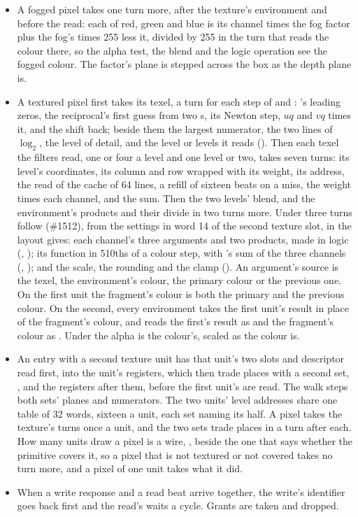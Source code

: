 \begin{itemize}
of the blend in the turn the blend's divide takes, before the mask, so
a pixel takes no cycle more.
\item A fogged pixel takes one turn more, after the texture's
environment and before the read: each of red, green and blue is its
channel times the fog factor plus the fog's times 255 less it, divided
by 255 in the turn that reads the colour there, so the alpha test, the
blend and the logic operation see the fogged colour. The factor's
plane is stepped across the box as the depth plane is.
\item A textured pixel first takes its texel, a turn for each step of
 and : 's leading zeros,
the reciprocal's first guess from two s, its Newton step,
$uq$ and $vq$ times it, and the shift back; beside them the largest
numerator, the two lines of $\log_2$, the level of detail, and the
level or levels it reads (). Then each texel the
filters read, one or four a level and one level or two, takes seven
turns: its level's coordinates, its column and row wrapped with its
weight, its address, the read of the cache of 64 lines, a refill of
sixteen beats on a miss, the weight times each channel, and the sum.
Then the two levels' blend, and the environment's products and their
divide in two turns more. Under  three turns follow
(\#1512), from the settings in word 14 of the second texture slot, in the layout
 gives: each channel's three
arguments and two products, made in logic (,
); its function in 510ths of a colour step, with
's sum of the three channels (,
); and the scale, the rounding and the clamp
(). An argument's source is the texel, the environment's
colour, the primary colour or the previous one. On the first unit the
fragment's colour is both the primary and the previous colour. On the second, every
environment takes the first unit's result in place of the fragment's
colour, and  reads the first's result as
 and the fragment's colour as .
Under  the alpha is the colour's, scaled as the
colour is.
\item An entry with a second texture unit has that unit's two slots and
descriptor read first, into the unit's registers, which then trade
places with a second set, ,  and the registers
after them, before the first unit's are read. The walk steps both sets' planes and numerators. The
two units' level addresses share one table of 32 words, sixteen a unit,
each set naming its half. A pixel takes the texture's turns once a
unit, and the two sets trade places in a turn after each. How many
units draw a pixel is a wire, , beside the one that says
whether the primitive covers it, so a pixel that is not textured or not
covered takes no turn more, and a pixel of one unit takes what it
did.
\item When a write response and a read beat arrive together, the
write's identifier goes back first and the read's waits a cycle.
Grants are taken and dropped.
\end{itemize}

